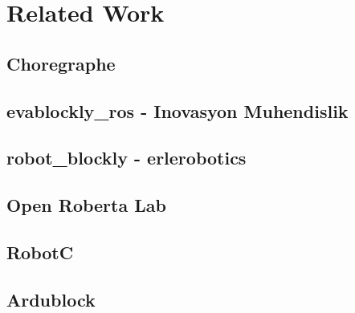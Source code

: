 \chapter{Related Work}
\section{Choregraphe}
\section{evablockly\_ros - Inovasyon Muhendislik}
\section{robot\_blockly - erlerobotics}
\section{Open Roberta Lab}
\section{RobotC}
\section{Ardublock}